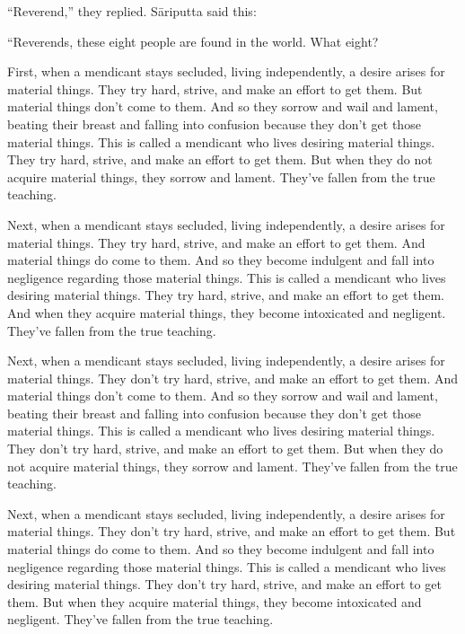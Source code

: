 \documentclass[12pt,openany]{book}%
\begin{document}
“Reverend,” they replied. \textsanskrit{Sāriputta} said this: 

“Reverends, these eight people are found in the world. What eight? 

First, when a mendicant stays secluded, living independently, a desire arises for material things. They try hard, strive, and make an effort to get them. But material things don’t come to them. And so they sorrow and wail and lament, beating their breast and falling into confusion because they don’t get those material things. This is called a mendicant who lives desiring material things. They try hard, strive, and make an effort to get them. But when they do not acquire material things, they sorrow and lament. They’ve fallen from the true teaching. 

Next, when a mendicant stays secluded, living independently, a desire arises for material things. They try hard, strive, and make an effort to get them. And material things do come to them. And so they become indulgent and fall into negligence regarding those material things. This is called a mendicant who lives desiring material things. They try hard, strive, and make an effort to get them. And when they acquire material things, they become intoxicated and negligent. They’ve fallen from the true teaching. 

Next, when a mendicant stays secluded, living independently, a desire arises for material things. They don’t try hard, strive, and make an effort to get them. And material things don’t come to them. And so they sorrow and wail and lament, beating their breast and falling into confusion because they don’t get those material things. This is called a mendicant who lives desiring material things. They don’t try hard, strive, and make an effort to get them. But when they do not acquire material things, they sorrow and lament. They’ve fallen from the true teaching. 

Next, when a mendicant stays secluded, living independently, a desire arises for material things. They don’t try hard, strive, and make an effort to get them. But material things do come to them. And so they become indulgent and fall into negligence regarding those material things. This is called a mendicant who lives desiring material things. They don’t try hard, strive, and make an effort to get them. But when they acquire material things, they become intoxicated and negligent. They’ve fallen from the true teaching. 
\end{document}
